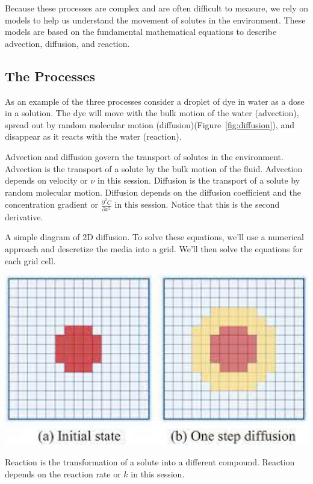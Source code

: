 \documentclass{tufte-handout}\usepackage[]{graphicx}\usepackage[]{xcolor}
\begin{document}
Because these processes are complex and are often difficult to measure, we rely on models to help us understand the movement of solutes in the environment. These models are based on the fundamental mathematical equations to describe advection, diffusion, and reaction.

\subsection{The Processes}

As an example of the three processes consider a droplet of dye in water as a dose in a solution. The dye will move with the bulk motion of the water (advection), spread out by random molecular motion (diffusion)(Figure~\ref{fig:diffusion}), and disappear as it reacts with the water (reaction).

Advection and diffusion govern the transport of solutes in the environment. Advection is the transport of a solute by the bulk motion of the fluid. Advection depends on velocity or $\nu$ in this session. Diffusion is the transport of a solute by random molecular motion. Diffusion depends on the diffusion coefficient and the concentration gradient or $\frac{\partial^2 C}{\partial x^2}$ in this session. Notice that this is the second derivative. 

\begin{marginfigure}
\caption{A simple diagram of 2D diffusion. To solve these equations, we'll use a numerical approach and descretize the media into a grid. We'll then solve the equations for each grid cell.}
\label{fig:diffusion}
\includegraphics[width=1.0\textwidth]{graphics/2D_diffusion.png}
\end{marginfigure}

Reaction is the transformation of a solute into a different compound. Reaction depends on the reaction rate or $k$ in this session.
\end{document}
